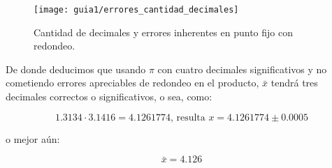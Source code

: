 \begin{figure}
	\centering
	\texttt{[image: guia1/errores\_cantidad\_decimales]}
	\caption{Cantidad de decimales y errores inherentes en punto fijo con redondeo.}
	\label{fig:g1:errores_cantidad_decimales}
\end{figure}


De donde deducimos que usando $\pi$ con cuatro decimales significativos y no cometiendo errores apreciables de redondeo en el producto, $\bar{x}$ tendrá tres decimales correctos o significativos, o sea, como:

\[1.3134\cdot 3.1416 = 4.1261774\text{, resulta }x=4.1261774 \pm 0.0005\]

o mejor aún:

\[\bar{x} = 4.126\]

